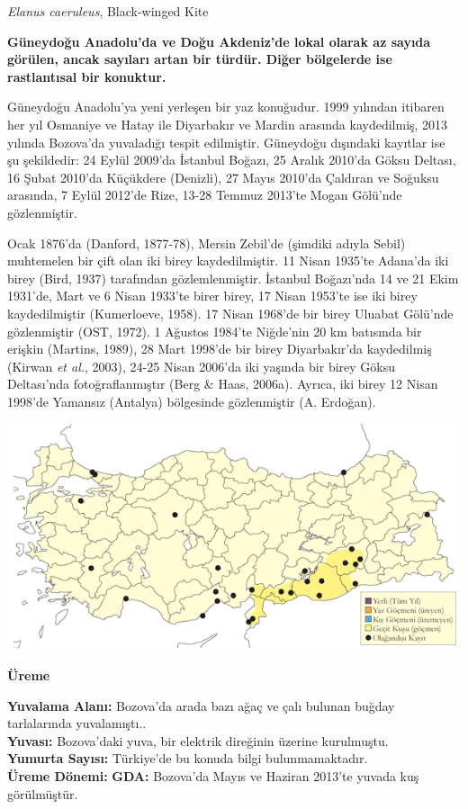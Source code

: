 \documentclass[
  a4paper,
  DIV=11,
  numbers=noendperiod]{scrreprt}
\begin{document}
\emph{Elanus caeruleus}, Black-winged Kite

\textbf{Güneydoğu Anadolu'da ve Doğu Akdeniz'de lokal olarak az sayıda
görülen, ancak sayıları artan bir türdür. Diğer bölgelerde ise
rastlantısal bir konuktur.}

Güneydoğu Anadolu'ya yeni yerleşen bir yaz konuğudur. 1999 yılından
itibaren her yıl Osmaniye ve Hatay ile Diyarbakır ve Mardin arasında
kaydedilmiş, 2013 yılında Bozova'da yuvaladığı tespit edilmiştir.
Güneydoğu dışındaki kayıtlar ise şu şekildedir: 24 Eylül 2009'da
İstanbul Boğazı, 25 Aralık 2010'da Göksu Deltası, 16 Şubat 2010'da
Küçükdere (Denizli), 27 Mayıs 2010'da Çaldıran ve Soğuksu arasında, 7
Eylül 2012'de Rize, 13-28 Temmuz 2013'te Mogan Gölü'nde gözlenmiştir.

Ocak 1876'da (Danford, 1877-78), Mersin Zebil'de (şimdiki adıyla Sebil)
muhtemelen bir çift olan iki birey kaydedilmiştir. 11 Nisan 1935'te
Adana'da iki birey (Bird, 1937) tarafından gözlemlenmiştir. İstanbul
Boğazı'nda 14 ve 21 Ekim 1931'de, Mart ve 6 Nisan 1933'te birer birey,
17 Nisan 1953'te ise iki birey kaydedilmiştir (Kumerloeve, 1958). 17
Nisan 1968'de bir birey Uluabat Gölü'nde gözlenmiştir (OST, 1972). 1
Ağustos 1984'te Niğde'nin 20 km batısında bir erişkin (Martins, 1989),
28 Mart 1998'de bir birey Diyarbakır'da kaydedilmiş (Kirwan \emph{et
al.}, 2003), 24-25 Nisan 2006'da iki yaşında bir birey Göksu Deltası'nda
fotoğraflanmıştır (Berg \& Haas, 2006a). Ayrıca, iki birey 12 Nisan
1998'de Yamansız (Antalya) bölgesinde gözlenmiştir (A. Erdoğan).

\includegraphics{images/harita_Page_082.png}

\textbf{Üreme}

\textbf{Yuvalama Alanı:} Bozova'da arada bazı ağaç ve çalı bulunan
buğday tarlalarında yuvalamıştı..\\
\textbf{Yuvası:} Bozova'daki yuva, bir elektrik direğinin üzerine
kurulmuştu.\\
\textbf{Yumurta Sayısı:} Türkiye'de bu konuda bilgi bulunmamaktadır.\\
\textbf{Üreme Dönemi:} \textbf{GDA:} Bozova'da Mayıs ve Haziran 2013'te
yuvada kuş görülmüştür.
\end{document}
